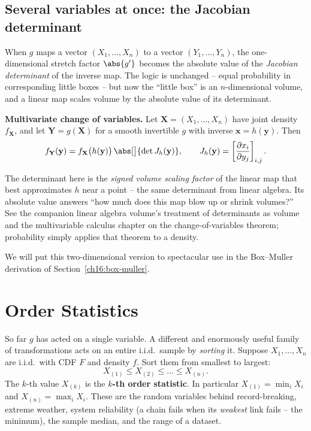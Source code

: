 \subsection{Several variables at once: the Jacobian determinant}

When $g$ maps a vector $(X_1,\dots,X_n)$ to a vector $(Y_1,\dots,Y_n)$, the one-dimensional
stretch factor $\abs{g'}$ becomes the absolute value of the \emph{Jacobian determinant} of
the inverse map. The logic is unchanged -- equal probability in corresponding little boxes
-- but now the ``little box'' is an $n$-dimensional volume, and a linear map scales volume
by the absolute value of its determinant.

\begin{formalbox}
\textbf{Multivariate change of variables.} Let $\mathbf{X}=(X_1,\dots,X_n)$ have joint
density $f_{\mathbf X}$, and let $\mathbf Y = g(\mathbf X)$ for a smooth invertible $g$
with inverse $\mathbf x = h(\mathbf y)$. Then
\[
  f_{\mathbf Y}(\mathbf y)
  = f_{\mathbf X}\big(h(\mathbf y)\big)\,\abs[\big]{\det J_h(\mathbf y)},
  \qquad
  J_h(\mathbf y) = \left[\frac{\partial x_i}{\partial y_j}\right]_{i,j}.
\]
\end{formalbox}

\begin{connectionbox}
The determinant here is the \emph{signed volume scaling factor} of the linear map that best
approximates $h$ near a point -- the same determinant from linear algebra. Its absolute
value answers ``how much does this map blow up or shrink volumes?'' See the companion
linear algebra volume's treatment of determinants as volume and the multivariable calculus
chapter on the change-of-variables theorem; probability simply applies that theorem to a
density.
\end{connectionbox}

We will put this two-dimensional version to spectacular use in the Box--Muller derivation
of Section~\ref{ch16:box-muller}.

\section{Order Statistics}
\label{ch16:order-stats}

So far $g$ has acted on a single variable. A different and enormously useful family of
transformations acts on an entire i.i.d.\ sample by \emph{sorting} it. Suppose
$X_1,\dots,X_n$ are i.i.d.\ with CDF $F$ and density $f$. Sort them from smallest to
largest:
\[
  X_{(1)} \le X_{(2)} \le \dots \le X_{(n)}.
\]
The $k$-th value $X_{(k)}$ is the \textbf{$k$-th order statistic}. In particular
$X_{(1)} = \min_i X_i$ and $X_{(n)} = \max_i X_i$. These are the random variables behind
record-breaking, extreme weather, system reliability (a chain fails when its
\emph{weakest} link fails -- the minimum), the sample median, and the range of a dataset.

